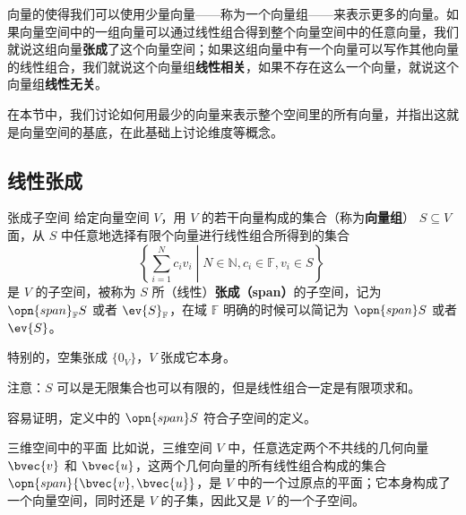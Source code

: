 
\begin{issues}
\issueTODO
\end{issues}


向量的使得我们可以使用少量向量——称为一个向量组——来表示更多的向量。如果向量空间中的一组向量可以通过线性组合得到整个向量空间中的任意向量，我们就说这组向量\textbf{张成}了这个向量空间；如果这组向量中有一个向量可以写作其他向量的线性组合，我们就说这个向量组\textbf{线性相关}，如果不存在这么一个向量，就说这个向量组\textbf{线性无关}。

在本节中，我们讨论如何用最少的向量来表示整个空间里的所有向量，并指出这就是向量空间的基底，在此基础上讨论维度等概念。

\subsection{线性张成}

\begin{definition}{张成子空间}\label{def_VecSpn_1}
给定向量空间 $V$，用 $V$ 的若干向量构成的集合（称为\textbf{向量组}） $S \subseteq V$面，从 $S$ 中任意地选择有限个向量进行线性组合所得到的集合 
\begin{equation}
\left\{\sum_{i = 1}^N c_iv_i \middle| N \in\mathbb{N}, c_i\in\mathbb{F}, v_i \in S\right\}~
\end{equation}
是 $V$ 的子空间，被称为 $S$ 所（线性）\textbf{张成（span）}的子空间，记为 $\opn{span}_\mathbb{F} S$ 或者 $\ev{S}_\mathbb{F}$，在域 $\mathbb{F}$ 明确的时候可以简记为 $\opn{span} S$ 或者 $\ev{S}$。

特别的，空集张成 $\{0_V\}$，$V$ 张成它本身。
\end{definition}

注意：$S$ 可以是无限集合也可以有限的，但是线性组合一定是有限项求和。

容易证明，定义中的 $\opn{span} S$ 符合子空间的定义。
\begin{example}{三维空间中的平面}
比如说，三维空间 $V$ 中，任意选定两个不共线的几何向量 $\bvec{v}$ 和 $\bvec{u}$，这两个几何向量的所有线性组合构成的集合 $\opn{span}\{\bvec{v}, \bvec{u}\}$，是 $V$ 中的一个过原点的平面；它本身构成了一个向量空间，同时还是 $V$ 的子集，因此又是 $V$ 的一个子空间。
\end{example}


